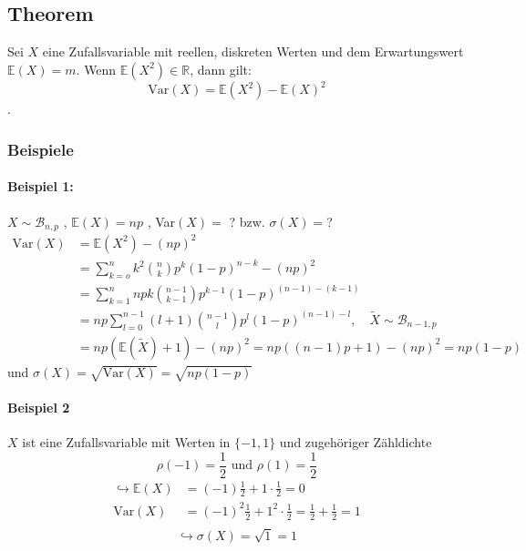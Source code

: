 \documentclass[12pt,a4paper]{article}
\begin{document}
 	\subsection{Theorem}
 	Sei $X$ eine Zufallsvariable mit reellen, diskreten Werten und dem Erwartungswert $\mathbb{E}(X)=m$. Wenn $\mathbb{E}(X^2)\in\mathbb{R}$, dann gilt:
 	$$\text{Var}(X)=\mathbb{E}(X^2)-\mathbb{E}(X)^2$$.
 	
 	\subsubsection{Beispiele}
 	\paragraph{Beispiel 1:}
 	$X\sim \mathcal{B}_{n,p}$ , $\mathbb{E}(X)=np$ , Var$(X)=$ ? bzw. $\sigma(X)=$?
	\begin{equation*}
	\begin{split}
	\text{Var}(X) & = \mathbb{E}(X^2)-(np)^2\\
	& = \sum_{k=o}^n k^2 \binom{n}{k}p^k (1-p)^{n-k} -(np)^2\\
	& = \sum_{k=1}^n npk\binom{n-1}{k-1}p^{k-1}(1-p)^{(n-1)-(k-1)}\\
	& = np\sum_{l=0}^{n-1} (l+1)\binom{n-1}{l}p^l(1-p)^{(n-1)-l} , \quad 
\tilde{X}\sim\mathcal{B}_{n-1,p}\\
	& = np\left(\mathbb{E}(\tilde{X})+1\right)-(np)^2 = np\left(\left(n-1\right)p+1\right)-(np)^2
= np(1-p)
	\end{split}
	\end{equation*}	 	
 	und $\sigma(X)=\sqrt{\text{Var}(X)}=\sqrt{np(1-p)}$
 	
 	\paragraph{Beispiel 2}
 	$X$ ist eine Zufallsvariable mit Werten in $\{-1,1\}$ und zugehöriger Zähldichte
 	$$\rho(-1) = \frac{1}{2} \text{ und } \rho(1)=\frac{1}{2}$$
 	\begin{equation*}
 	\begin{split}
 	\hookrightarrow \mathbb{E}(X) & = (-1)\frac{1}{2} + 1\cdot \frac{1}{2}=0\\
 	\text{Var}(X) & = (-1)^2\frac{1}{2} + 1^2\cdot \frac{1}{2}=\frac{1}{2} + \frac{1}{2}=1\\
 	\end{split}
 	\end{equation*}
 	$$\hookrightarrow \sigma(X)=\sqrt{1}=1$$
 	
\end{document}
